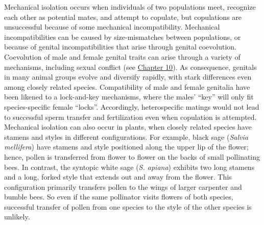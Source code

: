 \documentclass[
]{book}
\begin{document}
Mechanical isolation occurs when individuals of two populations meet, recognize each other as potential mates, and attempt to copulate, but copulations are unsuccessful because of some mechanical incompatibility. Mechanical incompatibilities can be caused by size-mismatches between populations, or because of genital incompatibilities that arise through genital coevolution. Coevolution of male and female genital traits can arise through a variety of mechanisms, including sexual conflict (see \href{social-behavior-and-sexual-selection.html\#sexual-conflict}{Chapter 10}). As consequence, genitals in many animal groups evolve and diversify rapidly, with stark differences even among closely related species. Compatibility of male and female genitalia have been likened to a lock-and-key mechanisms, where the males' ``key'' will only fit species-specific female ``locks''. Accordingly, heterospecific matings would not lead to successful sperm transfer and fertilization even when copulation is attempted. Mechanical isolation can also occur in plants, when closely related species have stamens and styles in different configurations. For example, black sage (\emph{Salvia mellifera}) have stamens and style positioned along the upper lip of the flower; hence, pollen is transferred from flower to flower on the backs of small pollinating bees. In contrast, the syntopic white sage (\emph{S. apiana}) exhibits two long stamens and a long, forked style that extends out and away from the flower. This configuration primarily transfers pollen to the wings of larger carpenter and bumble bees. So even if the same pollinator visits flowers of both species, successful transfer of pollen from one species to the style of the other species is unlikely.
\end{document}
